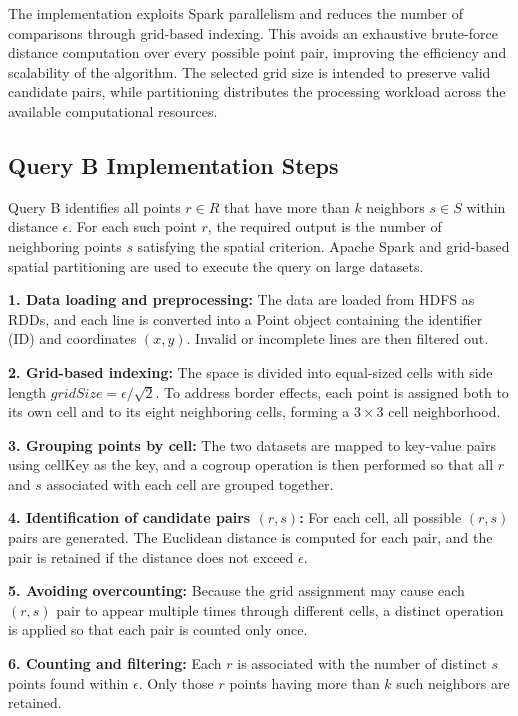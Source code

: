 \documentclass[sigconf,nonacm]{acmart}
\begin{document}
The implementation exploits Spark parallelism and reduces the number of comparisons through grid-based indexing. This avoids an exhaustive brute-force distance computation over every possible point pair, improving the efficiency and scalability of the algorithm. The selected grid size is intended to preserve valid candidate pairs, while partitioning distributes the processing workload across the available computational resources.

\subsection*{Query B Implementation Steps}

Query B identifies all points $r \in R$ that have more than $k$ neighbors $s \in S$ within distance $\epsilon$. For each such point $r$, the required output is the number of neighboring points $s$ satisfying the spatial criterion. Apache Spark and grid-based spatial partitioning are used to execute the query on large datasets.

 
\textbf{1. Data loading and preprocessing:} The data are loaded from HDFS as RDDs, and each line is converted into a Point object containing the identifier (ID) and coordinates $(x, y)$. Invalid or incomplete lines are then filtered out.
    
\textbf{2. Grid-based indexing:} The space is divided into equal-sized cells with side length $gridSize = \epsilon / \sqrt{2}$. To address border effects, each point is assigned both to its own cell and to its eight neighboring cells, forming a $3\times3$ cell neighborhood.
    
\textbf{3. Grouping points by cell:} The two datasets are mapped to key-value pairs using cellKey as the key, and a cogroup operation is then performed so that all $r$ and $s$ associated with each cell are grouped together.
    
\textbf{4. Identification of candidate pairs $(r, s)$:} For each cell, all possible $(r, s)$ pairs are generated. The Euclidean distance is computed for each pair, and the pair is retained if the distance does not exceed $\epsilon$.
    
\textbf{5. Avoiding overcounting:} Because the grid assignment may cause each $(r, s)$ pair to appear multiple times through different cells, a distinct operation is applied so that each pair is counted only once.
    
\textbf{6. Counting and filtering:} Each $r$ is associated with the number of distinct $s$ points found within $\epsilon$. Only those $r$ points having more than $k$ such neighbors are retained.
    
\end{document}
